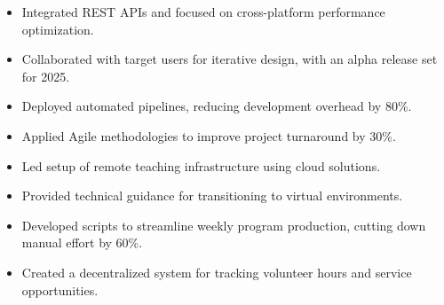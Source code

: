 \par\smallskip
\noindent
\begin{minipage}{20cm}
  \begin{minipage}{9.75cm}
    \begin{itemize}
      \item Integrated REST APIs and focused on cross-platform performance optimization.
      \item Collaborated with target users for iterative design, with an alpha release set for 2025.
    \end{itemize}
  \end{minipage}
  \hfill
  \begin{minipage}{9.75cm}
    \begin{itemize}
      \item Deployed automated pipelines, reducing development overhead by 80\%.
      \item Applied Agile methodologies to improve project turnaround by 30\%.
    \end{itemize}
  \end{minipage}
\end{minipage}
\par\smallskip
\divider

\par\smallskip
\noindent
\begin{minipage}{20cm}
  \begin{minipage}{9.75cm}
    \begin{itemize}
      \item Led setup of remote teaching infrastructure using cloud solutions.
      \item Provided technical guidance for transitioning to virtual environments.
    \end{itemize}
  \end{minipage}
  \hfill
  \begin{minipage}{9.75cm}

    \begin{itemize}
      \item Developed scripts to streamline weekly program production, cutting down manual effort by 60\%.
      \item Created a decentralized system for tracking volunteer hours and service opportunities.
    \end{itemize}
  \end{minipage}
\end{minipage}

